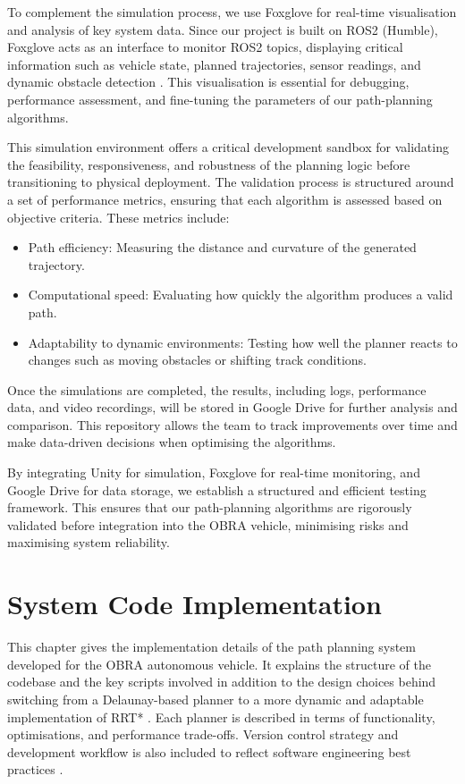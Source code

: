 \documentclass[a4paper,11pt]{report}
\begin{document}
To complement the simulation process, we use Foxglove for real-time visualisation and analysis of key 
system data. Since our project is built on ROS2 (Humble), Foxglove acts as an interface to monitor ROS2 
topics, displaying critical information such as vehicle state, planned trajectories, sensor readings, and 
dynamic obstacle detection \cite{reference20}. This visualisation is essential for debugging, performance assessment, 
and fine-tuning the parameters of our path-planning algorithms.

This simulation environment offers a critical development sandbox for validating the feasibility, responsiveness, 
and robustness of the planning logic before transitioning to physical deployment. The validation process is structured 
around a set of performance metrics, ensuring that each algorithm is assessed based on objective criteria. These metrics include:

\begin{itemize}
    \item Path efficiency: Measuring the distance and curvature of the generated trajectory.
    \item Computational speed: Evaluating how quickly the algorithm produces a valid path.
    \item Adaptability to dynamic environments: Testing how well the planner reacts to changes such as moving obstacles or shifting track conditions.
\end{itemize}

Once the simulations are completed, the results, including logs, performance data, and video 
recordings, will be stored in Google Drive for further analysis and comparison. This repository allows 
the team to track improvements over time and make data-driven decisions when optimising the algorithms.

By integrating Unity for simulation, Foxglove for real-time monitoring, and Google Drive for data storage, 
we establish a structured and efficient testing framework. This ensures that our path-planning algorithms are 
rigorously validated before integration into the OBRA vehicle, minimising risks and maximising system reliability.

\chapter{System Code Implementation}
This chapter gives the implementation details of the path planning system developed for the OBRA autonomous vehicle. 
It explains the structure of the codebase and the key scripts involved in addition to the design choices behind switching 
from a Delaunay-based planner to a more dynamic and adaptable implementation of RRT* \cite{reference6}. Each planner is described in terms of 
functionality, optimisations, and performance trade-offs. Version control strategy and development workflow is also included 
to reflect software engineering best practices \cite{reference18}.
\end{document}

